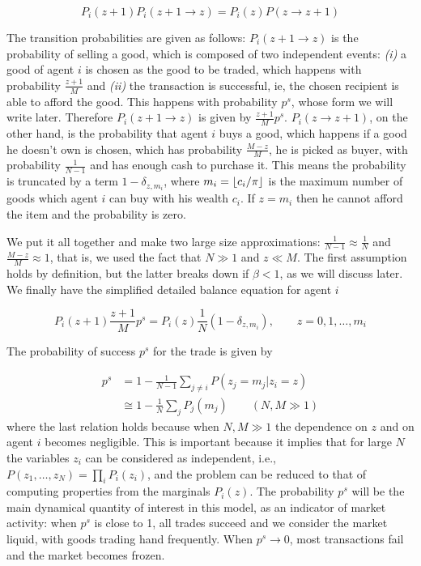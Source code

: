 \begin{equation}
P_i(z + 1) P_i(z + 1 \to z) = P_i(z) P(z \to z + 1)
\end{equation}

The transition probabilities are given as follows: $P_i(z + 1 \to z)$ is the probability of selling a good, which is composed of two independent events: \emph{(i)} a good of agent $i$ is chosen as the good to be traded, which happens with probability $\frac{z+1}{M}$ and \emph{(ii)} the transaction is successful, ie, the chosen recipient is able to afford the good. This happens with probability $p^s$, whose form we will write later. Therefore $P_i(z + 1 \to z)$ is given by $\frac{z+1}{M}  p^s$. $P_i(z \to z+1)$, on the other hand, is the probability that agent $i$ buys a good, which happens if a good he doesn't own is chosen, which has probability $\frac{M - z}{M}$, he is picked as buyer, with probability $\frac{1}{N-1}$ and has enough cash to purchase it. This means the probability is truncated by a term $1-\delta_{z, m_{i}}$, where $m_{i}=\lfloor c_i / \pi\rfloor$ is the maximum number of goods which agent $i$ can buy with his wealth $c_i$. If $z=m_{i}$ then he cannot afford the item and the probability is zero.

We put it all together and make two large size approximations: $\frac{1}{N-1} \approx \frac{1}{N}$ and $\frac{M -z}{M} \approx 1$, that is, we used the fact that $N \gg 1$ and $z \ll M$. The first assumption holds by definition, but the latter breaks down if $\beta < 1$, as we will discuss later. We finally have the simplified detailed balance equation for agent $i$


\begin{equation}
P_i(z+1)  \frac{z+1}{M}  p^s =  P_i(z) \frac{1}{N} \left(1-\delta_{z, m_{i}}\right) ,\qquad z=0,1,\ldots, m_i
\label{eq:master_equation_simple_k1}
\end{equation}

The probability of success $p^s$ for the trade is given by

\begin{align}
p^s & =  1-\frac{1}{N-1}\sum_{j\neq i} P(z_j=m_j|z_i=z) \\
 & \cong  1-\frac{1}{N}\sum_{j} P_j(m_j)\qquad (N,M\gg 1)
\label{eq:ps_1Guy}
\end{align}
where the last relation holds because when $N,M\gg 1$ the dependence on $z$ and on agent $i$ becomes negligible. This is important because it implies that for large $N$ the variables $z_i$ can be considered as independent, i.e., $P(z_1,\ldots, z_N)=\prod_i P_i(z_i)$, and the problem can be reduced to that of computing properties from the marginals $P_i(z)$. The probability $p^s$ will be the main dynamical quantity of interest in this model, as an indicator of market activity: when $p^s$ is close to 1, all trades succeed and we consider the market liquid, with goods trading hand frequently. When $p^s \to 0$, most transactions fail and the market becomes frozen.

